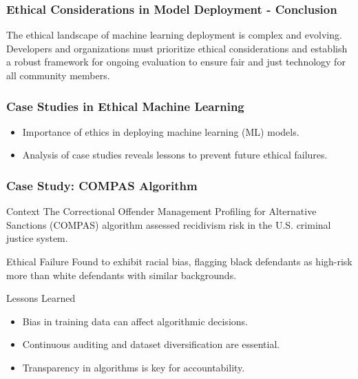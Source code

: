 \documentclass[aspectratio=169]{beamer}
\begin{document}
\begin{frame}[fragile]
    \frametitle{Ethical Considerations in Model Deployment - Conclusion}
    The ethical landscape of machine learning deployment is complex and evolving. Developers and organizations must prioritize ethical considerations and establish a robust framework for ongoing evaluation to ensure fair and just technology for all community members.
\end{frame}

\begin{frame}[fragile]
    \frametitle{Case Studies in Ethical Machine Learning}
    \begin{itemize}
        \item Importance of ethics in deploying machine learning (ML) models.
        \item Analysis of case studies reveals lessons to prevent future ethical failures.
    \end{itemize}
\end{frame}

\begin{frame}[fragile]
    \frametitle{Case Study: COMPAS Algorithm}
    \begin{block}{Context}
        The Correctional Offender Management Profiling for Alternative Sanctions (COMPAS) algorithm assessed recidivism risk in the U.S. criminal justice system.
    \end{block}
    
    \begin{block}{Ethical Failure}
        Found to exhibit racial bias, flagging black defendants as high-risk more than white defendants with similar backgrounds.
    \end{block}

    \begin{block}{Lessons Learned}
        \begin{itemize}
            \item Bias in training data can affect algorithmic decisions.
            \item Continuous auditing and dataset diversification are essential.
            \item Transparency in algorithms is key for accountability.
        \end{itemize}
    \end{block}
\end{frame}
\end{document}
